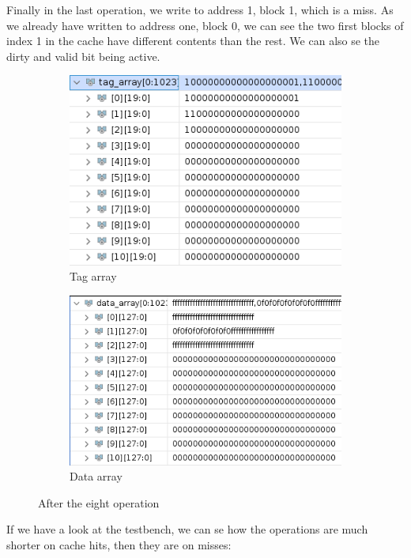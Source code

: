 \documentclass{article}
\begin{document}
Finally in the last operation, we write to address 1, block 1, which is a miss. As we already have written to address one, block 0, we can see the two first blocks of index 1 in the cache have different contents than the rest. We can also se the dirty and valid bit being active.
\begin{figure}[H]
\centering
\begin{subfigure}{.5\textwidth}
  \centering
  \includegraphics[width=.8\linewidth]{img/tag6.png}
  \caption{Tag array}
\end{subfigure}%
\begin{subfigure}{.5\textwidth}
  \centering
  \includegraphics[width=.9\linewidth]{img/data6.png}
  \caption{Data array}
\end{subfigure}
\caption{After the eight operation}
\end{figure}


If we have a look at the testbench, we can se how the operations are much shorter on cache hits, then they are on misses:
\end{document}
